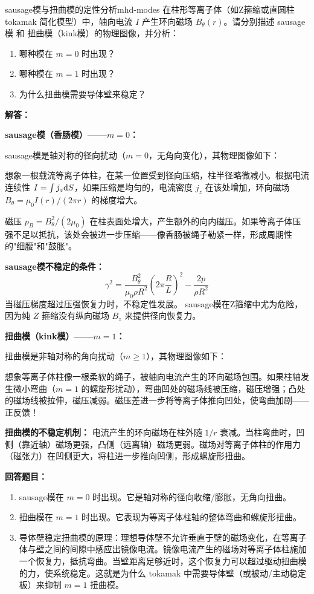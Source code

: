 \begin{example}{sausage模与扭曲模的定性分析}{mhd-modes}
在柱形等离子体（如Z箍缩或直圆柱 tokamak 简化模型）中，轴向电流 $I$ 产生环向磁场 $B_\theta(r)$。请分别描述 sausage模 和 扭曲模（kink模）的物理图像，并分析：
\begin{enumerate}[label=(\arabic*)]
\item 哪种模在 $m=0$ 时出现？
\item 哪种模在 $m=1$ 时出现？
\item 为什么扭曲模需要导体壁来稳定？
\end{enumerate}
\tcblower
\textbf{解答：}

\textbf{sausage模（香肠模）——$m=0$：}

 sausage模是轴对称的径向扰动（$m=0$，无角向变化），其物理图像如下：

想象一根载流等离子体柱，在某一位置受到径向压缩，柱半径略微减小。根据电流连续性 $I = \int j_z \mathrm{d} S$，如果压缩是均匀的，电流密度 $j_z$ 在该处增加，环向磁场 $B_\theta = \mu_0 I(r)/(2\pi r)$ 的梯度增大。

磁压 $p_B = B_\theta^2/(2\mu_0)$ 在柱表面处增大，产生额外的向内磁压。如果等离子体压强不足以抵抗，该处会被进一步压缩——像香肠被绳子勒紧一样，形成周期性的"细腰"和"鼓胀"。

\textbf{ sausage模不稳定的条件：}
\[
\gamma^2 = \frac{B_\theta^2}{\mu_0\rho R^2}\left(2\pi\frac{R}{L}\right)^2 - \frac{2p}{\rho R^2}
\]
当磁压梯度超过压强恢复力时，不稳定性发展。 sausage模在Z箍缩中尤为危险，因为纯 $Z$ 箍缩没有纵向磁场 $B_z$ 来提供径向恢复力。

\textbf{扭曲模（kink模）——$m=1$：}

扭曲模是非轴对称的角向扰动（$m \geq 1$），其物理图像如下：

想象等离子体柱像一根柔软的绳子，被轴向电流产生的环向磁场包围。如果柱轴发生微小弯曲（$m=1$ 的螺旋形扰动），弯曲凹处的磁场线被压缩，磁压增强；凸处的磁场线被拉伸，磁压减弱。磁压差进一步将等离子体推向凹处，使弯曲加剧——正反馈！

\textbf{扭曲模的不稳定机制：}
电流产生的环向磁场在柱外随 $1/r$ 衰减。当柱弯曲时，凹侧（靠近轴）磁场更强，凸侧（远离轴）磁场更弱。磁场对等离子体柱的作用力（磁张力）在凹侧更大，将柱进一步推向凹侧，形成螺旋形扭曲。

\textbf{回答题目：}
\begin{enumerate}[label=(\arabic*)]
\item sausage模在 $m=0$ 时出现。它是轴对称的径向收缩/膨胀，无角向扭曲。
\item 扭曲模在 $m=1$ 时出现。它表现为等离子体柱轴的整体弯曲和螺旋形扭曲。
\item 导体壁稳定扭曲模的原理：理想导体壁不允许垂直于壁的磁场变化，在等离子体与壁之间的间隙中感应出镜像电流。镜像电流产生的磁场对等离子体柱施加一个恢复力，抵抗弯曲。当壁距离足够近时，这个恢复力可以超过驱动扭曲模的力，使系统稳定。这就是为什么 tokamak 中需要导体壁（或被动/主动稳定板）来抑制 $m=1$ 扭曲模。
\end{enumerate}


\end{example}
